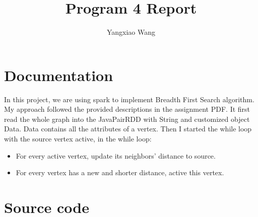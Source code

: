 \documentclass[11pt, letterpaper]{article}
\title{\textbf{Program 4 Report}}
\author{Yangxiao Wang}
\date{ }
\begin{document}
	
	\maketitle
	
	\tableofcontents
	\pagebreak
	
	\section{Documentation}
	In this project, we are using spark to implement Breadth First Search algorithm. My approach followed the provided descriptions in the assignment PDF. It first read the whole graph into the JavaPairRDD with String and customized object Data. Data contains all the attributes of a vertex. Then I started the while loop with the source vertex active, in the while loop:
	\begin{itemize} 
		\item For every active vertex, update its neighbors' distance to source. 
		\item For every vertex has a new and shorter distance, active this vertex.
	\end{itemize}
	
	\section {Source code}
\end{document}
